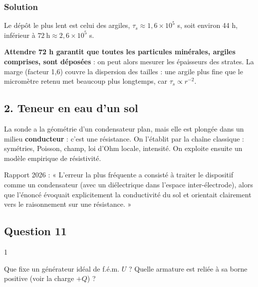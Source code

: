 \documentclass[11pt,a4paper]{article}
\begin{document}
\hypertarget{solution-9}{%
\subsubsection{Solution}\label{solution-9}}

Le dépôt le plus lent est celui des argiles, \(\tau_s\approx1{,}6\times10^5\) s, soit environ 44 h, inférieur à \(72\ \mathrm h\approx2{,}6\times10^5\) s.

\textbf{Attendre 72 h garantit que toutes les particules minérales, argiles comprises, sont déposées} : on peut alors mesurer les épaisseurs des strates. La marge (facteur 1,6) couvre la dispersion des tailles : une argile plus fine que le micromètre retenu met beaucoup plus longtemps, car \(\tau_s\propto r^{-2}\).

\hypertarget{teneur-en-eau-dun-sol}{%
\subsection{2. Teneur en eau d'un sol}\label{teneur-en-eau-dun-sol}}

La sonde a la géométrie d'un condensateur plan, mais elle est plongée dans un milieu \textbf{conducteur} : c'est une résistance. On l'établit par la chaîne classique : symétries, Poisson, champ, loi d'Ohm locale, intensité. On exploite ensuite un modèle empirique de résistivité.

\begin{piege}

Rapport 2026 : « L'erreur la plus fréquente a consisté à traiter le dispositif comme un condensateur (avec un diélectrique dans l'espace inter-électrode), alors que l'énoncé évoquait explicitement la conductivité du sol et orientait clairement vers le raisonnement sur une résistance. »

\end{piege}

\hypertarget{question-11}{%
\subsection{Question 11}\label{question-11}}

\begin{indication}{1}

Que fixe un générateur idéal de f.é.m. \(U\) ? Quelle armature est reliée à sa borne positive (voir la charge \(+Q\)) ?

\end{indication}
\end{document}
